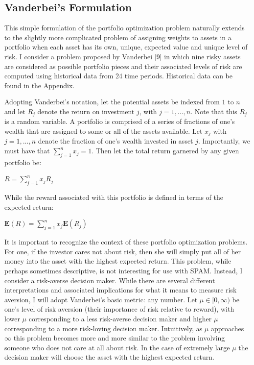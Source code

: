 \documentclass{article}
\begin{document}
\subsection{Vanderbei's Formulation}
This simple formulation of the portfolio optimization problem naturally extends to the slightly more complicated problem of assigning weights to assets in a portfolio when each asset has its own, unique, expected value and unique level of risk. I consider a problem proposed by Vanderbei [9] in which nine risky assets are considered as possible portfolio pieces and their associated levels of risk are computed using historical data from 24 time periods. Historical data can be found in the Appendix. 

Adopting Vanderbei's notation, let the potential assets be indexed from $1$ to $n$ and let $R_j$ denote the return on investment $j$, with $j = 1,...,n$. Note that this $R_j$ is a random variable. A portfolio is comprised of a series of fractions of one's wealth that are assigned to some or all of the assets available. Let $x_j$ with $j = 1,...,n$ denote the fraction of one's wealth invested in asset $j$. Importantly, we must have that $\sum_{j=1}^{n} x_j = 1$. Then let the total return garnered by any given portfolio be:

\begin{center}
    $R = \sum_{j=1}^{n} x_jR_j$
\end{center}

While the reward associated with this portfolio is defined in terms of the expected return:

\begin{center}
    $\mathbf{E}(R) = \sum_{j=1}^{n} x_j\mathbf{E}(R_j)$
\end{center}

It is important to recognize the context of these portfolio optimization problems. For one, if the investor cares not about risk, then she will simply put all of her money into the asset with the highest expected return. This problem, while perhaps sometimes descriptive, is not interesting for use with SPAM. Instead, I consider a risk-averse decision maker. While there are several different interpretations and associated implications for what it means to measure risk aversion, I will adopt Vanderbei's basic metric: any number. Let $\mu \in [0,\infty)$ be one's level of risk aversion (their importance of risk relative to reward), with lower $\mu$ corresponding to a less risk-averse decision maker and higher $\mu$ corresponding to a more risk-loving decision maker. Intuitively, as $\mu$ approaches $\infty$ this problem becomes more and more similar to the problem involving someone who does not care at all about risk. In the case of extremely large $\mu$ the decision maker will choose the asset with the highest expected return. 
\end{document}
